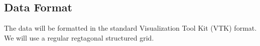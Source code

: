 



\subsection{Data Format}
The data will be formatted in the standard Visualization Tool Kit (VTK) format. We will use a regular regtagonal structured grid.
